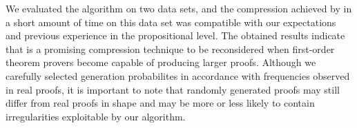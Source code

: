 We evaluated the algorithm on two data sets, and
the compression achieved by {\FORPI} in a short amount of time on this data set was compatible with our expectations and previous experience in the propositional level. 
The obtained results indicate that {\FORPI} is a promising compression technique to be reconsidered when first-order theorem provers become capable of producing larger proofs. Although we carefully selected generation probabilites in accordance with frequencies observed in real proofs, it is important to note that randomly generated proofs may still differ from real proofs in shape and may be more or less likely to contain irregularities exploitable by our algorithm. 

